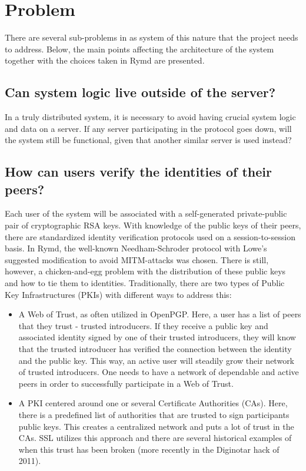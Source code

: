 \section{Problem}
There are several sub-problems in as system of this nature that the project needs to address. Below, the main points affecting the architecture of the system together with the choices taken in Rymd are presented.
\subsection{Can system logic live outside of the server?}
In a truly distributed system, it is necessary to avoid having crucial system logic and data on a server. If any server participating in the protocol goes down, will the system still be functional, given that another similar server is used instead?
\subsection{How can users verify the identities of their peers?}
Each user of the system will be associated with a self-generated private-public pair of cryptographic RSA keys. With knowledge of the public keys of their peers, there are standardized identity verification protocols used on a session-to-session basis. In Rymd, the well-known Needham-Schroder protocol with Lowe's suggested modification to avoid MITM-attacks was chosen. There is still, however, a chicken-and-egg problem with the distribution of these public keys and how to tie them to identities. Traditionally, there are two types of Public Key Infrastructures (PKIs) with different ways to address this:
\begin{itemize}
\item A Web of Trust, as often utilized in OpenPGP. Here, a user has a list of peers that they trust - trusted introducers. If they receive a public key and associated identity signed by one of their trusted introducers, they will know that the trusted introducer has verified the connection between the identity and the public key. This way, an active user will steadily grow their network of trusted introducers. One needs to have a network of dependable and active peers in order to successfully participate in a Web of Trust.
\item A PKI centered around one or several Certificate Authorities (CAs). Here, there is a predefined list of authorities that are trusted to sign participants public keys. This creates a centralized network and puts a lot of trust in the CAs. SSL utilizes this approach and there are several historical examples of when this trust has been broken (more recently in the Diginotar hack of 2011).
\end{itemize}
